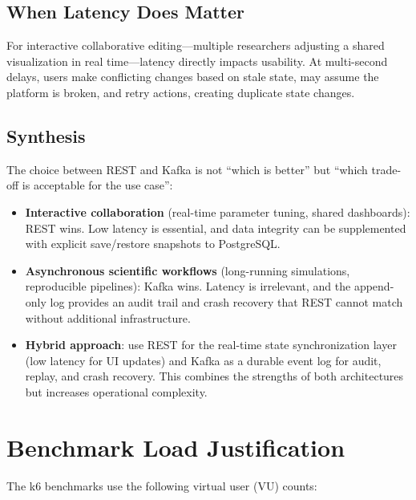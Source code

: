 \documentclass[11pt,a4paper]{article}
\begin{document}
\subsection{When Latency Does Matter}

For interactive collaborative editing---multiple researchers adjusting
a shared visualization in real time---latency directly impacts usability.
At multi-second delays, users make conflicting changes based on stale
state, may assume the platform is broken, and retry actions, creating
duplicate state changes.

\subsection{Synthesis}

The choice between REST and Kafka is not ``which is better'' but
``which trade-off is acceptable for the use case'':

\begin{itemize}
  \item \textbf{Interactive collaboration} (real-time parameter tuning,
        shared dashboards): REST wins. Low latency is essential, and
        data integrity can be supplemented with explicit save/restore
        snapshots to PostgreSQL.
  \item \textbf{Asynchronous scientific workflows} (long-running
        simulations, reproducible pipelines): Kafka wins. Latency is
        irrelevant, and the append-only log provides an audit trail
        and crash recovery that REST cannot match without additional
        infrastructure.
  \item \textbf{Hybrid approach}: use REST for the real-time state
        synchronization layer (low latency for UI updates) and Kafka
        as a durable event log for audit, replay, and crash recovery.
        This combines the strengths of both architectures but increases
        operational complexity.
\end{itemize}

\section{Benchmark Load Justification}

The k6 benchmarks use the following virtual user (VU) counts:
\end{document}
